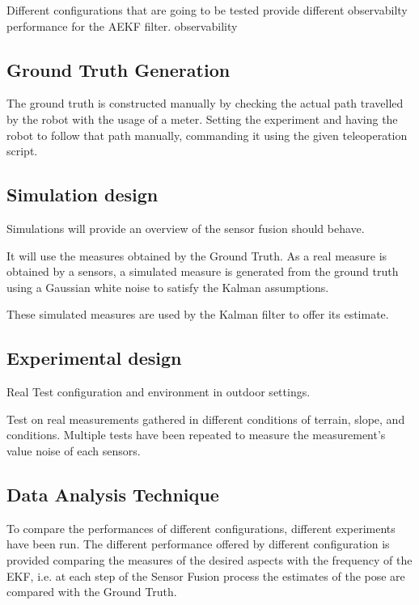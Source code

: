 Different configurations that are going to be tested provide different observabilty performance for the AEKF filter.
observability

\subsection{Ground Truth Generation}
\label{sec:gt}


\noindent The ground truth is constructed manually by checking the actual path travelled by the robot with the usage of a meter. Setting the experiment and having the robot to follow that path manually, commanding it using the given teleoperation script.



\subsection{Simulation design}
\label{sec:simDesign}

\noindent Simulations will provide an overview of the sensor fusion should behave.

It will use the measures obtained by the Ground Truth. 
As a real measure is obtained by a sensors, a simulated measure is generated from the ground truth using a Gaussian white noise to satisfy the Kalman assumptions.

These simulated measures are used by the Kalman filter to offer its estimate.


\subsection{Experimental design}
\label{sec:experimentalDesign}

\noindent Real Test configuration and environment in outdoor settings.

Test on real measurements gathered in different conditions of terrain, slope, and conditions.
Multiple tests have been repeated to measure the measurement's value noise of each sensors.



\subsection{Data Analysis Technique}

\noindent To compare the performances of different configurations, different experiments have been run. 
The different performance offered by different configuration is provided comparing the measures of the desired aspects with the frequency of the \gls{EKF}, i.e. at each step of the Sensor Fusion process the estimates of the pose are compared with the Ground Truth.



